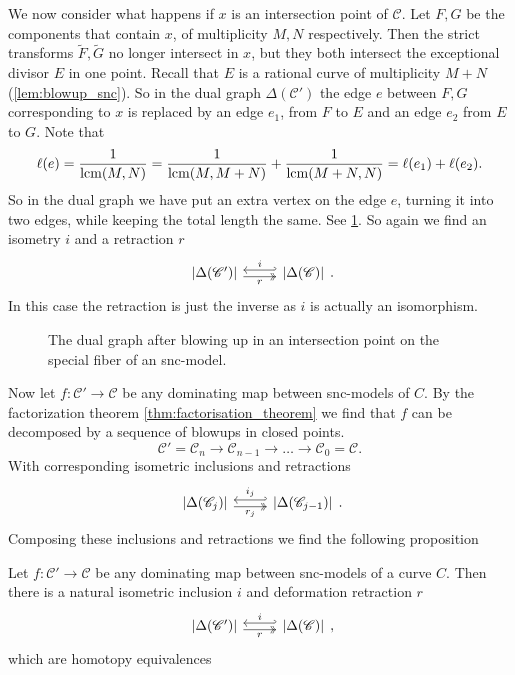 \medskip

We now consider what happens if $x$ is an intersection point of $\mathscr C$. 
Let $F, G$ be the components that contain $x$, of multiplicity $M, N$ respectively. 
Then the strict transforms $\tilde F, \tilde G$ no longer intersect in $x$, but they both intersect the exceptional divisor $E$ in one point. 
Recall that $E$ is a rational curve of multiplicity $M + N$ (\cref{lem:blowup_snc}). 
So in the dual graph $\Delta(\mathscr C')$ the edge $e$ between $F, G$ corresponding to $x$ is replaced by an edge $e_1$, from $F$ to $E$ and an edge $e_2$ from $E$ to $G$. 
Note that \[
	\ell(e) = \frac{1}{\operatorname{lcm}(M, N)} = \frac{1}{\operatorname{lcm}(M, M + N)} + \frac{1}{\operatorname{lcm}(M+ N, N)} = \ell(e_1) + \ell(e_2)
.\]  
So in the dual graph we have put an extra vertex on the edge $e$, turning it into two edges, while keeping the total length the same.
See \cref{fig:blowup_intersection_points_skeleton}. 
So again we find an isometry $i$ and a retraction $r$
\[
\begin{tikzcd}
	{|\Delta(\mathscr C')|} \rar[hookleftarrow, shift left]{i} \rar[twoheadrightarrow, shift right, ']{r} & {|\Delta(\mathscr C)|} 
\end{tikzcd}
.\] 
In this case the retraction is just the inverse as $i$ is actually an isomorphism. 

\begin{figure}[ht]
    \centering
    \caption{The dual graph after blowing up in an intersection point on the special fiber of an snc-model. }
    \label{fig:blowup_intersection_points_skeleton}
\end{figure}

Now let $f:\mathscr C' \to \mathscr C$ be any dominating map between snc-models of $C$. 
By the factorization theorem \cref{thm:factorisation_theorem} we find that $f$ can be decomposed by a sequence of blowups in closed points. 
\[
\mathscr C' = \mathscr C_n \to \mathscr C_{n-1} \to \ldots \to \mathscr C_0 = \mathscr C
.\] 
With corresponding isometric inclusions and retractions 
\[
\begin{tikzcd}
	{|\Delta(\mathscr C_{j})|} \rar[hookleftarrow, shift left]{i_j} \rar[twoheadrightarrow, shift right, ']{r_j} & {|\Delta(\mathscr C_{j-1})|} 
\end{tikzcd}
.\] 
Composing these inclusions and retractions we find the following proposition
\begin{proposition}\label{prop:inclusion_retraction_dual_graph}
	Let $f:\mathscr C' \to \mathscr C$ be any dominating map between snc-models of a curve $C$. 
	Then there is a natural isometric inclusion $i$ and deformation retraction $r$
\[
\begin{tikzcd}
	{|\Delta(\mathscr C')|} \rar[hookleftarrow, shift left]{i} \rar[twoheadrightarrow, shift right, ']{r} & {|\Delta(\mathscr C)|} 
\end{tikzcd}
,\] 
	which are homotopy equivalences
\end{proposition}

